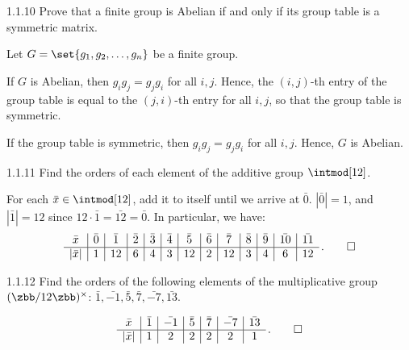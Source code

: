 \begin{exercise}{1.1.10}
    Prove that a finite group is Abelian if and only if its group table is a symmetric matrix.
\end{exercise}

\begin{sol}
    Let $G = \set{g_1, g_2, \ldots, g_n}$ be a finite group.
    
    \rightimp If $G$ is Abelian, then $g_i g_j = g_j g_i$ for all $i, j$.
	Hence, the $(i, j)$-th entry of the group table is equal to the $(j, i)$-th entry for all $i, j$, so that the group table is symmetric.

    \leftimp If the group table is symmetric, then $g_i g_j = g_j g_i$ for all $i, j$.
	Hence, $G$ is Abelian.
\end{sol}

\begin{exercise}{1.1.11}
    Find the orders of each element of the additive group $\intmod[12]$.
\end{exercise}

\begin{sol}
    For each $\bar x \in \intmod[12]$, add it to itself until we arrive at $\bar 0$. $|\bar 0| = 1$, and $|\bar 1| = 12$ since $12 \cdot \bar 1 = \bar{12} = \bar 0$.
	In particular, we have:
    \[
        \begin{array}{c|c|c|c|c|c|c|c|c|c|c|c|c}
            \bar x & \bar 0 & \bar 1 & \bar 2 & \bar 3 & \bar 4 & \bar 5 & \bar 6 & \bar 7 & \bar 8 & \bar 9 & \bar{10} & \bar{11} \\
            \hline
            |\bar x| & 1 & 12 & 6 & 4 & 3 & 12 & 2 & 12 & 3 & 4 & 6 & 12
        \end{array}\,. \qedhere
	\]
\end{sol}

\begin{exercise}{1.1.12}
    Find the orders of the following elements of the multiplicative group $(\zbb/12\zbb)^{\times}$: $\bar{1}, \bar{-1}, \bar{5}, \bar{7}, \bar{-7}, \bar{13}$.
\end{exercise}

\begin{sol}
    \[
    	\begin{array}{c|c|c|c|c|c|c}
            \bar x & \bar{1} & \bar{-1} & \bar{5} & \bar{7} & \bar{-7} & \bar{13} \\
            \hline
            |\bar x| & 1 & 2 & 2 & 2 & 2 & 1
        \end{array}\,. \qedhere
	\]
\end{sol}

